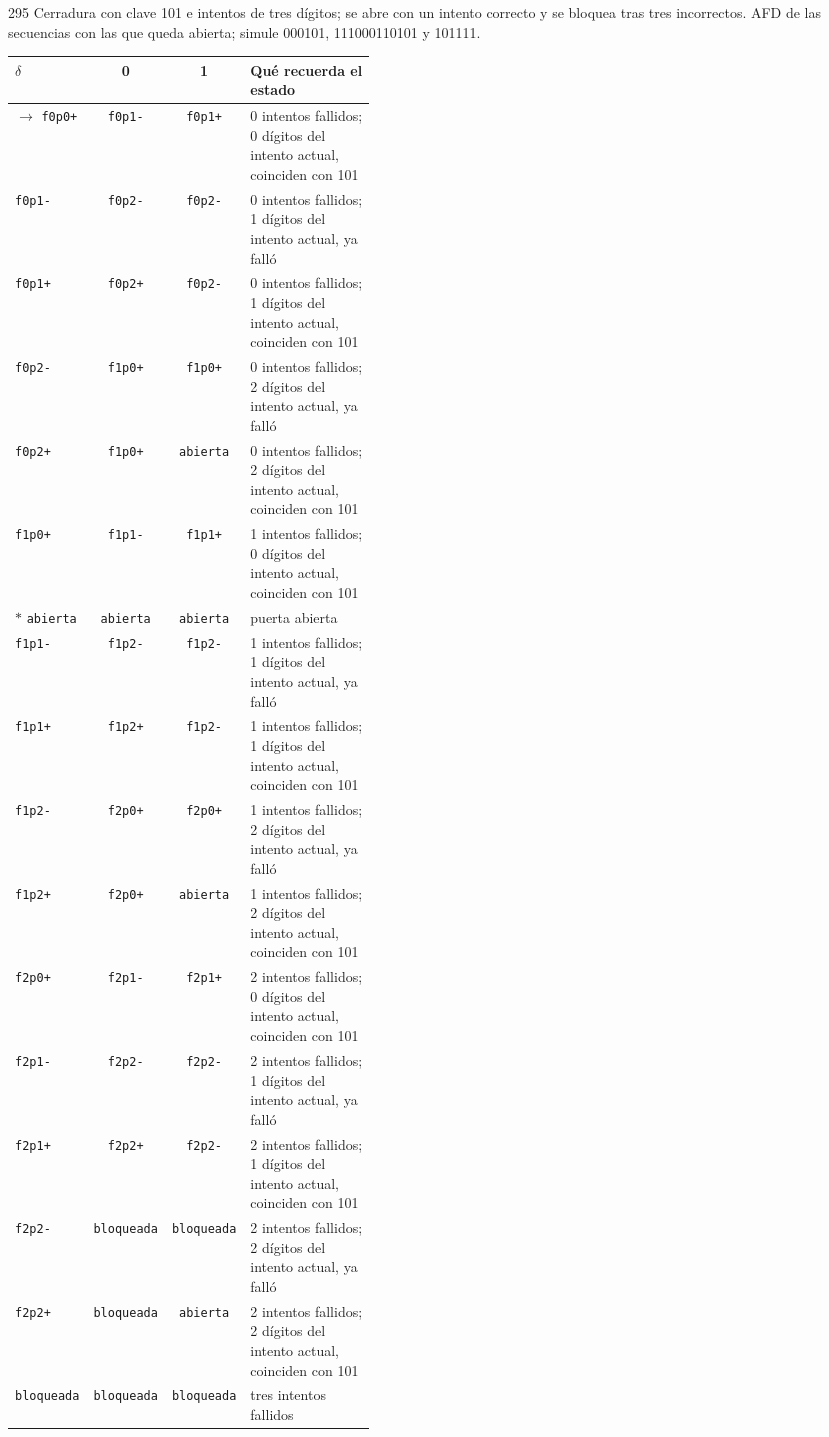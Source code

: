\documentclass[11pt]{article}
\begin{document}
\begin{ejercicio}{295}{}
Cerradura con clave 101 e intentos de tres dígitos; se abre con un intento correcto y se bloquea tras tres incorrectos. AFD de las secuencias con las que queda abierta; simule 000101, 111000110101 y 101111.
\end{ejercicio}
\proc \begin{center}\small\begin{tabular}{lccp{0.42\linewidth}}\toprule
$\delta$ & 0 & 1 & Qué recuerda el estado \\\midrule
$\to$ \texttt{f0p0+} & \texttt{f0p1-} & \texttt{f0p1+} & 0 intentos fallidos; 0 dígitos del intento actual, coinciden con 101 \\
 \texttt{f0p1-} & \texttt{f0p2-} & \texttt{f0p2-} & 0 intentos fallidos; 1 dígitos del intento actual, ya falló \\
 \texttt{f0p1+} & \texttt{f0p2+} & \texttt{f0p2-} & 0 intentos fallidos; 1 dígitos del intento actual, coinciden con 101 \\
 \texttt{f0p2-} & \texttt{f1p0+} & \texttt{f1p0+} & 0 intentos fallidos; 2 dígitos del intento actual, ya falló \\
 \texttt{f0p2+} & \texttt{f1p0+} & \texttt{abierta} & 0 intentos fallidos; 2 dígitos del intento actual, coinciden con 101 \\
 \texttt{f1p0+} & \texttt{f1p1-} & \texttt{f1p1+} & 1 intentos fallidos; 0 dígitos del intento actual, coinciden con 101 \\
$*$ \texttt{abierta} & \texttt{abierta} & \texttt{abierta} & puerta abierta \\
 \texttt{f1p1-} & \texttt{f1p2-} & \texttt{f1p2-} & 1 intentos fallidos; 1 dígitos del intento actual, ya falló \\
 \texttt{f1p1+} & \texttt{f1p2+} & \texttt{f1p2-} & 1 intentos fallidos; 1 dígitos del intento actual, coinciden con 101 \\
 \texttt{f1p2-} & \texttt{f2p0+} & \texttt{f2p0+} & 1 intentos fallidos; 2 dígitos del intento actual, ya falló \\
 \texttt{f1p2+} & \texttt{f2p0+} & \texttt{abierta} & 1 intentos fallidos; 2 dígitos del intento actual, coinciden con 101 \\
 \texttt{f2p0+} & \texttt{f2p1-} & \texttt{f2p1+} & 2 intentos fallidos; 0 dígitos del intento actual, coinciden con 101 \\
 \texttt{f2p1-} & \texttt{f2p2-} & \texttt{f2p2-} & 2 intentos fallidos; 1 dígitos del intento actual, ya falló \\
 \texttt{f2p1+} & \texttt{f2p2+} & \texttt{f2p2-} & 2 intentos fallidos; 1 dígitos del intento actual, coinciden con 101 \\
 \texttt{f2p2-} & \texttt{bloqueada} & \texttt{bloqueada} & 2 intentos fallidos; 2 dígitos del intento actual, ya falló \\
 \texttt{f2p2+} & \texttt{bloqueada} & \texttt{abierta} & 2 intentos fallidos; 2 dígitos del intento actual, coinciden con 101 \\
 \texttt{bloqueada} & \texttt{bloqueada} & \texttt{bloqueada} & tres intentos fallidos \\
\bottomrule\end{tabular}\end{center}
\end{document}
